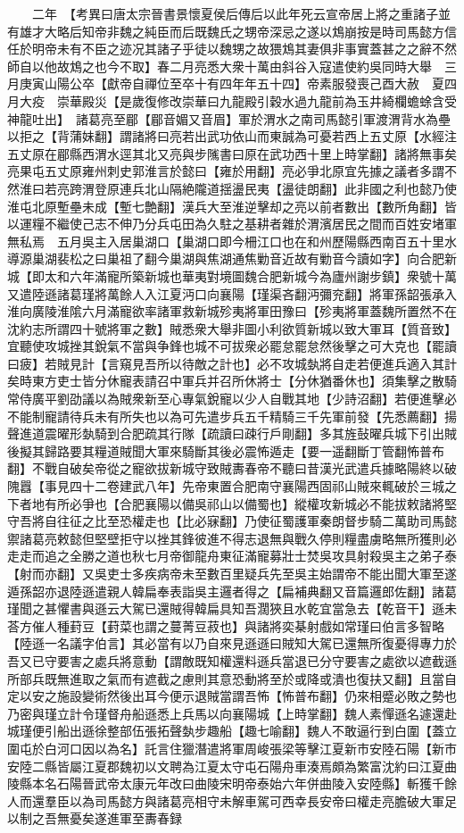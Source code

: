 　　二年　【考異曰唐太宗晉書景懷夏侯后傳后以此年死云宣帝居上將之重諸子並有雄才大略后知帝非魏之純臣而后既魏氏之甥帝深忌之遂以鴆崩按是時司馬懿方信任於明帝未有不臣之迹况其諸子乎徒以魏甥之故猥鴆其妻俱非事實蓋甚之之辭不然師自以他故鴆之也今不取】春二月亮悉大衆十萬由斜谷入寇遣使約吳同時大舉　三月庚寅山陽公卒【獻帝自禪位至卒十有四年年五十四】帝素服發喪己酉大赦　夏四月大疫　崇華殿災【是歲復修改崇華曰九龍殿引穀水過九龍前為玉井綺欄蟾蜍含受神龍吐出】　諸葛亮至郿【郿音媚又音眉】軍於渭水之南司馬懿引軍渡渭背水為壘以拒之【背蒲妹翻】謂諸將曰亮若出武功依山而東誠為可憂若西上五丈原【水經注五丈原在郿縣西渭水逕其北又亮與步隲書曰原在武功西十里上時掌翻】諸將無事矣亮果屯五丈原雍州刺史郭淮言於懿曰【雍於用翻】亮必爭北原宜先據之議者多謂不然淮曰若亮跨渭登原連兵北山隔絶隴道揺盪民夷【盪徒朗翻】此非國之利也懿乃使淮屯北原塹壘未成【塹七艶翻】漢兵大至淮逆擊却之亮以前者數出【數所角翻】皆以運糧不繼使己志不伸乃分兵屯田為久駐之基耕者雜於渭濱居民之間而百姓安堵軍無私焉　五月吳主入居巢湖口【巢湖口即今柵江口也在和州歷陽縣西南百五十里水導源巢湖裴松之曰巢祖了翻今巢湖與焦湖通焦勦音近故有勦音今讀如字】向合肥新城【即太和六年滿寵所築新城也華夷對境圖魏合肥新城今為廬州謝步鎮】衆號十萬又遣陸遜諸葛瑾將萬餘人入江夏沔口向襄陽【瑾渠吝翻沔彌兖翻】將軍孫韶張承入淮向廣陵淮隂六月滿寵欲率諸軍救新城殄夷將軍田豫曰【殄夷將軍蓋魏所置然不在沈約志所謂四十號將軍之數】賊悉衆大舉非圖小利欲質新城以致大軍耳【質音致】宜聽使攻城挫其銳氣不當與争鋒也城不可拔衆必罷怠罷怠然後擊之可大克也【罷讀曰疲】若賊見計【言窺見吾所以待敵之計也】必不攻城埶將自走若便進兵適入其計矣時東方吏士皆分休寵表請召中軍兵并召所休將士【分休猶番休也】須集擊之散騎常侍廣平劉劭議以為賊衆新至心專氣銳寵以少人自戰其地【少詩沼翻】若便進擊必不能制寵請待兵未有所失也以為可先遣步兵五千精騎三千先軍前發【先悉薦翻】揚聲進道震曜形埶騎到合肥疏其行隊【疏讀曰疎行戶剛翻】多其旌鼔曜兵城下引出賊後擬其歸路要其糧道賊聞大軍來騎斷其後必震怖遁走【要一遥翻斷丁管翻怖普布翻】不戰自破矣帝從之寵欲拔新城守致賊夀春帝不聽曰昔漢光武遣兵據略陽終以破隗囂【事見四十二卷建武八年】先帝東置合肥南守襄陽西固祁山賊來輒破於三城之下者地有所必爭也【合肥襄陽以備吳祁山以備蜀也】縱權攻新城必不能拔敕諸將堅守吾將自往征之比至恐權走也【比必寐翻】乃使征蜀護軍秦朗督步騎二萬助司馬懿禦諸葛亮敕懿但堅壁拒守以挫其鋒彼進不得志退無與戰久停則糧盡虜略無所獲則必走走而追之全勝之道也秋七月帝御龍舟東征滿寵募壯士焚吳攻具射殺吳主之弟子泰【射而亦翻】又吳吏士多疾病帝未至數百里疑兵先至吳主始謂帝不能出聞大軍至遂遁孫韶亦退陸遜遣親人韓扁奉表詣吳主邏者得之【扁補典翻又音篇邏郎佐翻】諸葛瑾聞之甚懼書與遜云大駕已還賊得韓扁具知吾濶狹且水乾宜當急去【乾音干】遜未荅方催人種葑豆【葑菜也謂之蔓菁豆菽也】與諸將奕棊射戲如常瑾曰伯言多智略【陸遜一名議字伯言】其必當有以乃自來見遜遜曰賊知大駕已還無所復憂得專力於吾又已守要害之處兵將意動【謂敵既知權還料遜兵當退已分守要害之處欲以遮截遜所部兵既無進取之氣而有遮截之慮則其意恐動將至於或降或潰也復扶又翻】且當自定以安之施設變術然後出耳今便示退賊當謂吾怖【怖普布翻】仍來相蹙必敗之勢也乃密與瑾立計令瑾督舟船遜悉上兵馬以向襄陽城【上時掌翻】魏人素憚遜名遽還赴城瑾便引船出遜徐整部伍張拓聲埶步趣船【趣七喻翻】魏人不敢逼行到白圍【蓋立圍屯於白河口因以為名】託言住獵潛遣將軍周峻張梁等擊江夏新市安陸石陽【新市安陸二縣皆屬江夏郡魏初以文聘為江夏太守屯石陽舟車湊焉頗為繁富沈約曰江夏曲陵縣本名石陽晉武帝太康元年改曰曲陵宋明帝泰始六年併曲陵入安陸縣】斬獲千餘人而還羣臣以為司馬懿方與諸葛亮相守未解車駕可西幸長安帝曰權走亮膽破大軍足以制之吾無憂矣遂進軍至夀春録